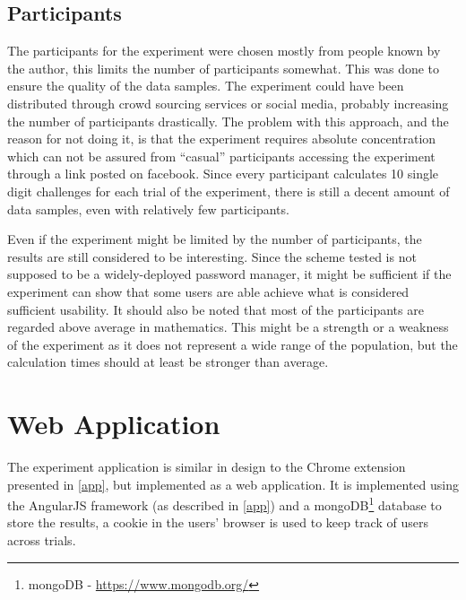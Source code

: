 \subsection{Participants}
The participants for the experiment were chosen mostly from people known by the author, this limits the number of participants somewhat. This was done to ensure the quality of the data samples. The experiment could have been distributed through crowd sourcing services or social media, probably increasing the number of participants drastically. The problem with this approach, and the reason for not doing it, is that the experiment requires absolute concentration which can not be assured from ``casual'' participants accessing the experiment through a link posted on facebook. Since every participant calculates 10 single digit challenges for each trial of the experiment, there is still a decent amount of data samples, even with relatively few participants. 
\par Even if the experiment might be limited by the number of participants, the results are still considered to be interesting. Since the scheme tested is not supposed to be a widely-deployed password manager, it might be sufficient if the experiment can show that some users are able achieve what is considered sufficient usability. It should also be noted that most of the participants are regarded above average in mathematics. This might be a strength or a weakness of the experiment as it does not represent a wide range of the population, but the calculation times should at least be stronger than average.


\section{Web Application}
The experiment application is similar in design to the Chrome extension presented in \autoref{app}, but implemented as a web application. It is implemented using the AngularJS framework (as described in \autoref{app}) and a mongoDB\footnote{mongoDB - \url{https://www.mongodb.org/}} database to store the results, a cookie in the users' browser is used to keep track of users across trials. 

